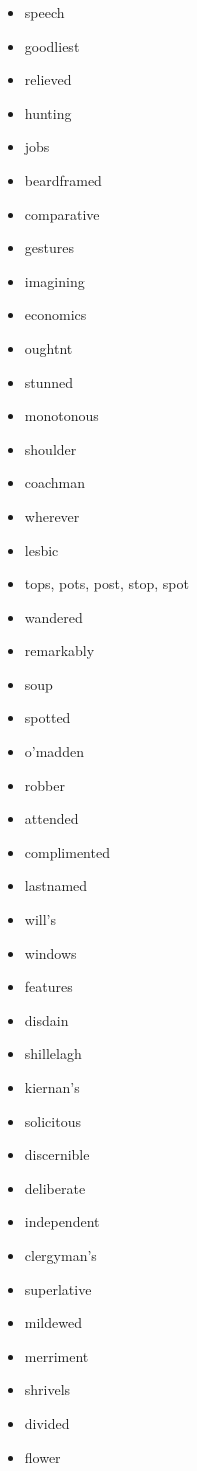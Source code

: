 \documentclass{article}
\begin{document}
\begin{itemize}
    \item speech
    \item goodliest
    \item relieved
    \item hunting
    \item jobs
    \item beardframed
    \item comparative
    \item gestures
    \item imagining
    \item economics
    \item oughtnt
    \item stunned
    \item monotonous
    \item shoulder
    \item coachman
    \item wherever
    \item lesbic
    \item tops, pots, post, stop, spot
    \item wandered
    \item remarkably
    \item soup
    \item spotted
    \item o'madden
    \item robber
    \item attended
    \item complimented
    \item lastnamed
    \item will's
    \item windows
    \item features
    \item disdain
    \item shillelagh
    \item kiernan's
    \item solicitous
    \item discernible
    \item deliberate
    \item independent
    \item clergyman's
    \item superlative
    \item mildewed
    \item merriment
    \item shrivels
    \item divided
    \item flower

\end{itemize}
\end{document}
